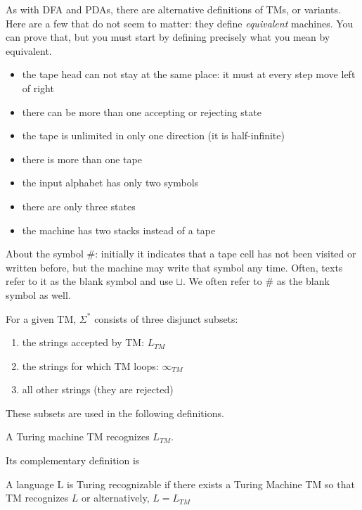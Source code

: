 As with DFA and PDAs, there are alternative definitions of TMs, or
variants. Here are a few that do not seem to matter: they define {\em
  equivalent} machines. You can prove that, but you must start by
defining precisely what you mean by equivalent.

\begin{itemize}
\item the tape head can not stay at the same place: it must at every step move left of right
\item there can be more than one accepting or rejecting state
\item the tape is unlimited in only one direction (it is half-infinite)
\item there is more than one tape
\item the input alphabet has only two symbols\label{twosymbols}
\item there are only three states
\item the machine has two stacks instead of a tape
\end{itemize}

About the symbol \#: initially it indicates that a tape cell has not
been visited or written before, but the machine may write that symbol
any time. Often, texts refer to it as the blank symbol and use
$\sqcup$. We often refer to \# as the blank symbol as well.


For a given TM, $\Sigma^*$ consists of three disjunct subsets:
\begin{enumerate}
\item the strings accepted by TM: $L_{TM}$
\item the strings for which TM loops: $\infty_{TM}$
\item all other strings (they are rejected)
\end{enumerate}
These subsets are used in the following definitions.



\begin{definition}[To recognize]
A Turing machine TM recognizes $L_{TM}$.
\end{definition}

Its complementary definition is

\begin{definition}
A language L is Turing recognizable if there exists a Turing Machine
TM so that TM recognizes $L$ or alternatively, $L = L_{TM}$
\end{definition}

